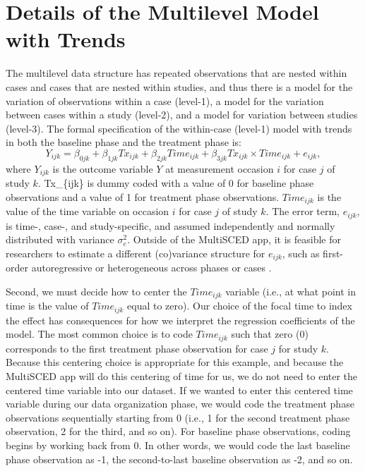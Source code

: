 \documentclass[
]{book}
\begin{document}
\hypertarget{details-of-the-multilevel-model-with-trends}{%
\section{Details of the Multilevel Model with Trends}\label{details-of-the-multilevel-model-with-trends}}

The multilevel data structure has repeated observations that are nested within cases and cases that are nested within studies, and thus there is a model for the variation of observations within a case (level-1), a model for the variation between cases within a study (level-2), and a model for variation between studies (level-3). The formal specification of the within-case (level-1) model with trends in both the baseline phase and the treatment phase is:
\begin{equation}
\label{eq:MLM-L1-Trend}
Y_{ijk} = \beta_{0jk} + \beta_{1jk}Tx_{ijk} + \beta_{2jk}Time_{ijk} + \beta_{3jk}Tx_{ijk} \times Time_{ijk} + e_{ijk},
\end{equation}
where \(Y_{ijk}\) is the outcome variable \(Y\) at measurement occasion \(i\) for case \(j\) of study \(k\). Tx\_\{ijk\} is dummy coded with a value of 0 for baseline phase observations and a value of 1 for treatment phase observations. \(Time_{ijk}\) is the value of the time variable on occasion \(i\) for case \(j\) of study \(k\). The error term, \(e_{ijk}\), is time-, case-, and study-specific, and assumed independently and normally distributed with variance \(\sigma_e^2\). Outside of the MultiSCED app, it is feasible for researchers to estimate a different (co)variance structure for \(e_{ijk}\), such as first-order autoregressive or heterogeneous across phases or cases \citep{Joo_et_al_2019, Petit-Bois_2014, baek2016using}.

Second, we must decide how to center the \(Time_{ijk}\) variable (i.e., at what point in time is the value of \(Time_{ijk}\) equal to zero). Our choice of the focal time to index the effect has consequences for how we interpret the regression coefficients of the model. The most common choice is to code \(Time_{ijk}\) such that zero (0) corresponds to the first treatment phase observation for case \(j\) for study \(k\). Because this centering choice is appropriate for this example, and because the MultiSCED app will do this centering of time for us, we do not need to enter the centered time variable into our dataset. If we wanted to enter this centered time variable during our data organization phase, we would code the treatment phase observations sequentially starting from 0 (i.e., 1 for the second treatment phase observation, 2 for the third, and so on). For baseline phase observations, coding begins by working back from 0. In other words, we would code the last baseline phase observation as -1, the second-to-last baseline observation as -2, and so on.
\end{document}
